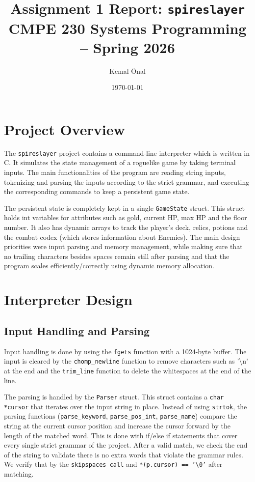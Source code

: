 \documentclass[a4paper,12pt]{article}
\title{Assignment 1 Report: \texttt{spireslayer}\\
\large CMPE 230 Systems Programming -- Spring 2026}
\author{
    Kemal Önal
}
\date{\today}
\begin{document}
\maketitle

\section{Project Overview}

The \texttt{spireslayer} project contains a command-line interpreter which is written in C. It simulates the state management of a roguelike game by taking terminal inputs. The main functionalities of the program are reading string inputs, tokenizing and parsing the inputs according to the strict grammar, and executing the corresponding commands to keep a persistent game state. 

The persistent state is completely kept in a single \texttt{GameState} struct. This struct holds int variables for attributes such as gold, current HP, max HP and the floor number. It also has dynamic arrays to track the player's deck, relics, potions and the combat codex (which stores information about Enemies). The main design priorities were input parsing and memory management, while making sure that no trailing characters besides spaces remain still after parsing and that the program scales efficiently/correctly using dynamic memory allocation.

\section{Interpreter Design}

\subsection{Input Handling and Parsing}

Input handling is done by using the \texttt{fgets} function with a 1024-byte buffer. The input is cleared by the \texttt{chomp\_newline} function to remove characters such as '\textbackslash n' at the end and the \texttt{trim\_line} function to delete the whitespaces at the end of the line.

The parsing is handled by the \texttt{Parser} struct. This struct contains a \texttt{char *cursor} that iterates over the input string in place. Instead of using \texttt{strtok}, the parsing functions (\texttt{parse\_keyword}, \texttt{parse\_pos\_int}, \texttt{parse\_name}) compare the string at the current cursor position and increase the cursor forward by the length of the matched word. This is done with if/else if statements that cover every single strict grammar of the project. After a valid match, we check the end of the string to validate there is no extra words that violate the grammar rules. We verify that by the \texttt{skipspaces call} and \texttt{*(p.cursor) == '\textbackslash0'} after matching.
\end{document}
